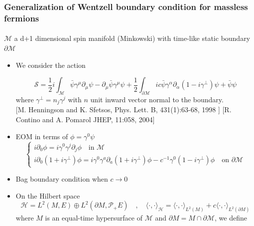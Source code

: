 \documentclass[english]{beamer}
\begin{document}
\begin{frame}[shrink=30]
\frametitle{\small{Generalization of Wentzell boundary condition for massless fermions}}
\framesubtitle{}

$\mathcal{M}$ a d+1 dimensional spin manifold (Minkowski) with time-like static boundary $\partial\mathcal{M}$

\begin{itemize}
\item<2-> We consider the action

\begin{equation*}
\mathcal{S} = \frac{1}{2}i\int_{\mathcal{M}} \bar{\psi} \gamma^\mu \partial_\mu \psi - \partial_\mu \bar{\psi} \gamma^\mu \psi 
+ \frac{1}{2}\int_{\partial \mathcal{M}} ic \bar{\psi} \gamma^\alpha \partial_\alpha (1 - i \gamma^\bot) \psi
+ \bar{\psi} \psi
\end{equation*}
where $\gamma^\bot = n_j\gamma^j$ with $n$ unit inward vector normal to the boundary.\\
\tiny\color{blue}[M. Henningson and K. Sfetsos,
Phys. Lett. B, 431(1):63-68, 1998
] \color{black}\normalsize
\tiny\color{blue} [R. Contino and A. Pomarol JHEP, 11:058, 2004]
\color{black}\normalsize
%
%
\item<3-> EOM in terms of $\phi = \gamma^0 \psi$
\begin{equation*}
\begin{cases}
i \partial_0 \phi = i \gamma^0 \gamma^j \partial_j \phi   \quad \textrm{in $\mathcal{M}$}\\
i \partial_0(1 + i\gamma^\bot) \phi = i\gamma^0 \gamma^a \partial_a (1+ i\gamma^\bot)\phi - c^{-1} \gamma^0(1 - i \gamma^{\bot})\phi \quad \textrm{on $\partial \mathcal{M}$}
\end{cases}
\end{equation*}
%
\item<4-> Bag boundary condition when $c\rightarrow0$ 
%
\item<5-> On the Hilbert space 
\begin{equation*}
\mathcal{H} = L^{2}(M,E)\oplus L^{2}(\partial M, \mathcal{P}_+ E) \quad,\quad
\langle \cdot, \cdot \rangle _\mathcal{H} = \langle \cdot, \cdot \rangle _{L^2(M)} + c \langle \cdot, \cdot \rangle _{L^2(\partial M)}
\end{equation*}
 where $M$ is an equal-time hypersurface of $\mathcal{M}$ and $\partial M = M\cap \partial \mathcal{M}$, we define



\end{itemize}
\end{frame}
\end{document}
